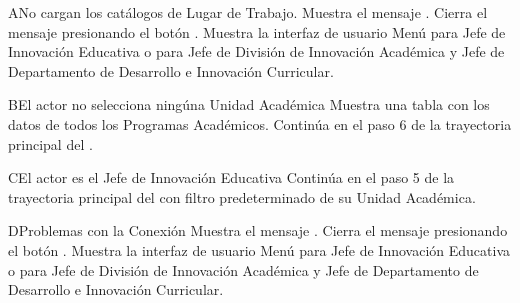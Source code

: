\begin{UCtrayectoriaA}{A}{No cargan los catálogos de Lugar de Trabajo.}
    \UCpaso Muestra el mensaje .
    \UCpaso[\UCactor] Cierra el mensaje presionando el botón .
     \UCpaso Muestra la interfaz de usuario Menú para Jefe de Innovación Educativa  o  para Jefe de División de Innovación Académica y Jefe de Departamento de Desarrollo e Innovación Curricular.
\end{UCtrayectoriaA}

\begin{UCtrayectoriaA}{B}{El actor no selecciona ningúna Unidad Académica}
    \UCpaso Muestra una tabla con los datos de todos los Programas Académicos.
    \UCpaso Continúa en el paso 6 de la trayectoria principal del .
\end{UCtrayectoriaA}

\begin{UCtrayectoriaA}{C}{El actor es el Jefe de Innovación Educativa}
    \UCpaso Continúa en el paso 5 de la trayectoria principal del  con filtro predeterminado de su Unidad Académica.
\end{UCtrayectoriaA}
\begin{UCtrayectoriaA}{D}{Problemas con la Conexión}
    \UCpaso Muestra el mensaje .
    \UCpaso[\UCactor] Cierra el mensaje presionando el botón .
    \UCpaso Muestra la interfaz de usuario Menú para Jefe de Innovación Educativa  o  para Jefe de División de Innovación Académica y Jefe de Departamento de Desarrollo e Innovación Curricular.
\end{UCtrayectoriaA}